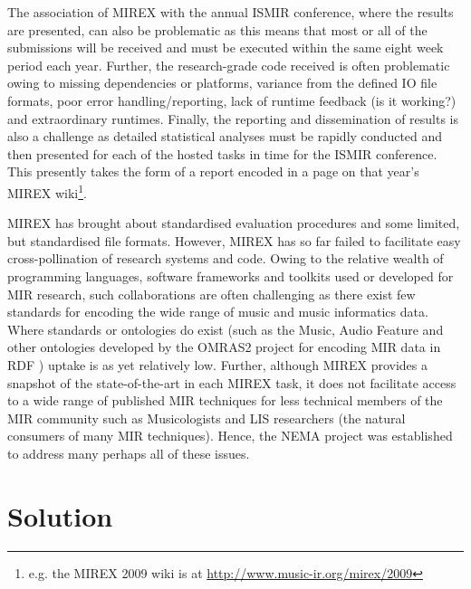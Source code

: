 \documentclass[conference]{IEEEtran}
\begin{document}
The association of MIREX with the annual ISMIR conference, where the results are presented, can also be problematic as this means that most or all of the submissions will be received and must be executed within the same eight week period each year. 
Further, the research-grade code received is often problematic owing to missing dependencies or platforms, variance from the defined IO file formats, poor error handling/reporting, lack of runtime feedback (is it working?) and extraordinary runtimes. 
Finally, the reporting and dissemination of results is also a challenge as detailed statistical analyses must be rapidly conducted and then presented for each of the hosted tasks in time for the ISMIR conference. This presently takes the form of a report encoded in a page on that year's MIREX wiki\footnote{e.g. the MIREX 2009 wiki is at \url{http://www.music-ir.org/mirex/2009}}.

MIREX has brought about standardised evaluation procedures and some limited, but standardised file formats.
However, MIREX has so far failed to facilitate easy cross-pollination of research systems and code. Owing to the relative wealth of programming languages, software frameworks and toolkits used or developed for MIR research, such collaborations are often challenging as there exist few standards for encoding the wide range of music and music informatics data. Where standards or ontologies do exist (such as the Music, Audio Feature and other ontologies developed by the OMRAS2 project for encoding MIR data in RDF \cite{raimond2007music}) uptake is as yet relatively low.  
Further, although MIREX provides a snapshot of the state-of-the-art in each MIREX task, it does not facilitate access to a wide range of published MIR techniques for less technical members of the MIR community such as Musicologists and LIS researchers (the natural consumers of many MIR techniques). Hence, the NEMA project was established to address many perhaps all of these issues.

\section{Solution}
\end{document}
